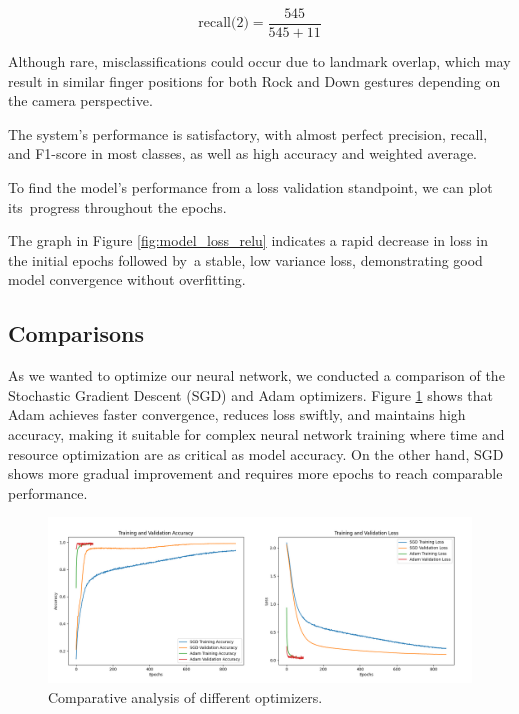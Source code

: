\begin{equation}
	\text{recall(2)} = \frac{545}{545 + 11}
	\label{eq:recall2}
\end{equation}

Although rare, misclassifications could occur due to landmark overlap, which may result in similar finger positions for both Rock and Down gestures depending on the camera perspective.

The system's performance is satisfactory, with almost perfect precision, recall, and F1-score in most classes, as well as high accuracy and weighted average.




To find the model's performance from a loss validation standpoint, we can plot its~progress throughout the epochs.




The graph in Figure \ref{fig:model_loss_relu} indicates a rapid decrease in loss in the initial epochs followed by~a stable, low variance loss, demonstrating good model convergence without overfitting.




\subsection*{Comparisons}
As we wanted to optimize our neural network, we conducted a comparison of the Stochastic Gradient Descent (SGD) and Adam optimizers. Figure \ref{fig:optimizers} shows that Adam achieves faster convergence, reduces loss swiftly, and maintains high accuracy, making it suitable for complex neural network training where time and resource optimization are as critical as model accuracy. On the other hand, SGD shows more gradual improvement and requires more epochs to reach comparable performance.

\begin{figure}[ht!]
	\centering
	\includegraphics[width=\textwidth]{images/optimizers_comparison.png}
	\caption{Comparative analysis of different optimizers.}
	\label{fig:optimizers}
\end{figure}


